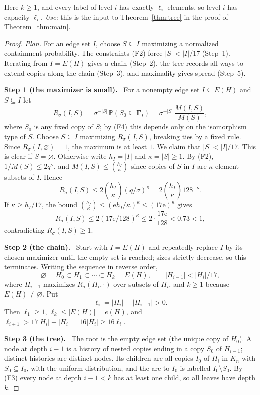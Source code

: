 \documentclass[11pt]{article}
\numberwithin{equation}{section}
\newcommand{\PP}{\mathbb P}
\newcommand{\ee}{\mathrm e}
\newcommand{\GG}{\boldsymbol\Gamma}
\newcommand{\step}[2]{\par\medskip\noindent\textbf{Step #1 (#2).}\ }
\begin{document}
Here $k\ge1$, and every label of level $i$ has exactly $\ell_i$
elements, so level $i$ has capacity $\ell_i$. \emph{Use:} this is the
input to Theorem~\ref{thm:tree} in the proof of
Theorem~\ref{thm:main}.

\begin{proof}
\emph{Plan.} For an edge set $I$, choose $S\subseteq I$ maximizing a
normalized containment probability. The constraints (F2) force
$|S|<|I|/17$ (Step~1). Iterating from $I=E(H)$ gives a chain
(Step~2), the tree records all ways to extend copies along the chain
(Step~3), and maximality gives spread (Step~5).

\step{1}{the maximizer is small}
For a nonempty edge set $I\subseteq E(H)$ and $S\subseteq I$ let
\begin{equation}\label{eq:maximizer}
 R_\sigma(I,S)=\sigma^{-|S|}\,\PP(S_0\subseteq\GG_I)
 =\sigma^{-|S|}\,\frac{M(I,S)}{M(S)},
\end{equation}
where $S_0$ is any fixed copy of $S$; by (F4) this depends only on the
isomorphism type of $S$. Choose $S\subseteq I$ maximizing
$R_\sigma(I,S)$, breaking ties by a fixed rule. Since
$R_\sigma(I,\varnothing)=1$, the maximum is at least $1$. We claim that
$|S|<|I|/17$. This is clear if $S=\varnothing$. Otherwise write
$h_I=|I|$ and $\kappa=|S|\ge1$. By (F2), $1/M(S)\le2q^\kappa$, and
$M(I,S)\le\binom{h_I}{\kappa}$ since copies of $S$ in $I$ are
$\kappa$-element subsets of $I$. Hence
\[
 R_\sigma(I,S)\le2\binom{h_I}{\kappa}(q/\sigma)^\kappa
           =2\binom{h_I}{\kappa}128^{-\kappa}.
\]
If $\kappa\ge h_I/17$, the bound
$\binom{h_I}{\kappa}\le(\ee h_I/\kappa)^\kappa\le(17\ee)^\kappa$ gives
\[
 R_\sigma(I,S)\le2(17\ee/128)^\kappa\le2\cdot\frac{17\ee}{128}<0.73<1,
\]
contradicting $R_\sigma(I,S)\ge1$.

\step{2}{the chain}
Start with $I=E(H)$ and repeatedly replace $I$ by its chosen maximizer
until the empty set is reached; sizes strictly decrease, so this
terminates. Writing the sequence in reverse order,
\[
 \varnothing=H_0\subset H_1\subset\cdots\subset H_k=E(H),
 \qquad |H_{i-1}|<|H_i|/17,
\]
where $H_{i-1}$ maximizes $R_\sigma(H_i,\cdot)$ over subsets of $H_i$,
and $k\ge1$ because $E(H)\ne\varnothing$. Put
\[
 \ell_i=|H_i|-|H_{i-1}|>0 .
\]
Then $\ell_1\ge1$, $\ell_k\le|E(H)|=e(H)$, and
$\ell_{i+1}>17|H_i|-|H_i|=16|H_i|\ge16\ell_i$.

\step{3}{the tree}
The root is the empty edge set (the unique copy of $H_0$). A node at
depth $i-1$ is a history of nested copies ending in a copy $S_0$ of
$H_{i-1}$; distinct histories are distinct nodes. Its children are all
copies $I_0$ of $H_i$ in $K_n$ with $S_0\subseteq I_0$, with the uniform
distribution, and the arc to $I_0$ is labelled $I_0\setminus S_0$. By
(F3) every node at depth $i-1<k$ has at least one child, so all leaves
have depth $k$.


\end{proof}
\end{document}
